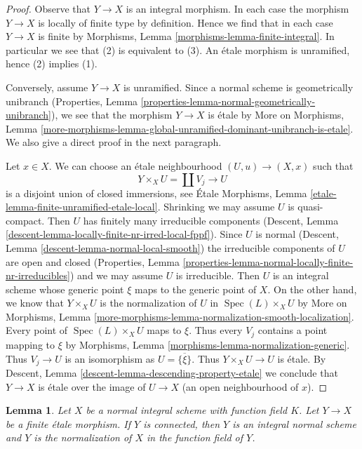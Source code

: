\documentclass{stacks-project}
\theoremstyle{plain}
\newtheorem{lemma}[subsection]{Lemma}
\theoremstyle{definition}
\theoremstyle{remark}
\numberwithin{equation}{subsection}
\def\Spec{\mathop{\mathrm{Spec}}}
\begin{document}
\begin{proof}
Observe that $Y \to X$ is an integral morphism.
In each case the morphism $Y \to X$ is locally of finite type
by definition.
Hence we find that in each case $Y \to X$ is finite by
Morphisms, Lemma \ref{morphisms-lemma-finite-integral}.
In particular we see that (2) is equivalent to (3).
An \'etale morphism is unramified, hence (2) implies (1).

\medskip\noindent
Conversely, assume $Y \to X$ is unramified. Since a normal scheme is
geometrically unibranch
(Properties, Lemma \ref{properties-lemma-normal-geometrically-unibranch}),
we see that the morphism $Y \to X$ is \'etale by More on Morphisms, Lemma
\ref{more-morphisms-lemma-global-unramified-dominant-unibranch-is-etale}.
We also give a direct proof in the next paragraph.

\medskip\noindent
Let $x \in X$.
We can choose an \'etale neighbourhood $(U, u) \to (X, x)$ such that
$$
Y \times_X U = \coprod V_j \longrightarrow U
$$
is a disjoint union of closed immersions, see
\'Etale Morphisms, Lemma \ref{etale-lemma-finite-unramified-etale-local}.
Shrinking we may assume $U$ is quasi-compact.
Then $U$ has finitely many irreducible components
(Descent, Lemma \ref{descent-lemma-locally-finite-nr-irred-local-fppf}).
Since $U$ is normal
(Descent, Lemma \ref{descent-lemma-normal-local-smooth}) the
irreducible components of $U$ are open and closed
(Properties, Lemma \ref{properties-lemma-normal-locally-finite-nr-irreducibles})
and we may assume $U$ is irreducible. Then $U$ is an integral
scheme whose generic point $\xi$ maps to the generic point of $X$.
On the other hand, we know that $Y \times_X U$
is the normalization of $U$ in $\Spec(L) \times_X U$
by More on Morphisms, Lemma
\ref{more-morphisms-lemma-normalization-smooth-localization}.
Every point of $\Spec(L) \times_X U$ maps to $\xi$.
Thus every $V_j$ contains a point mapping to $\xi$ by
Morphisms, Lemma \ref{morphisms-lemma-normalization-generic}.
Thus $V_j \to U$ is an isomorphism as $U = \overline{\{\xi\}}$.
Thus $Y \times_X U \to U$ is \'etale. By
Descent, Lemma \ref{descent-lemma-descending-property-etale}
we conclude that $Y \to X$ is \'etale over the
image of $U \to X$ (an open neighbourhood of $x$).
\end{proof}

\begin{lemma}
\label{lemma-finite-etale-covering-normal-unramified}
Let $X$ be a normal integral scheme with function field $K$.
Let $Y \to X$ be a finite \'etale morphism. If $Y$ is connected,
then $Y$ is an integral normal scheme and $Y$ is the normalization
of $X$ in the function field of $Y$.
\end{lemma}
\end{document}
